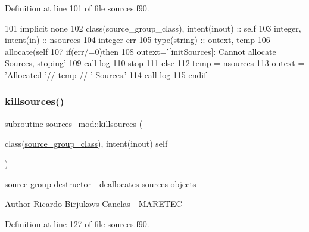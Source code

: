 Definition at line 101 of file sources.\+f90.


\begin{DoxyCode}
101     \textcolor{keywordtype}{implicit none}
102     \textcolor{keywordtype}{class}(source\_group\_class), \textcolor{keywordtype}{intent(inout)} :: self
103     \textcolor{keywordtype}{integer}, \textcolor{keywordtype}{intent(in)} :: nsources
104     \textcolor{keywordtype}{integer} err
105     \textcolor{keywordtype}{type}(string) :: outext, temp
106     \textcolor{keyword}{allocate}(self%
107     \textcolor{keywordflow}{if}(err/=0)\textcolor{keywordflow}{then}
108         outext=\textcolor{stringliteral}{'[initSources]: Cannot allocate Sources, stoping'}
109         \textcolor{keyword}{call }log%
110         stop
111     \textcolor{keywordflow}{else}
112         temp = nsources
113         outext = \textcolor{stringliteral}{'Allocated '}// temp // \textcolor{stringliteral}{' Sources.'}
114         \textcolor{keyword}{call }log%
115 \textcolor{keywordflow}{    endif}
\end{DoxyCode}
\mbox{\label{namespacesources__mod_aee745aa084adcfa41ecfc3469b90aa8e}} 
\subsubsection{\texorpdfstring{killsources()}{killsources()}}
{\footnotesize\ttfamily subroutine sources\+\_\+mod\+::killsources (\begin{DoxyParamCaption}\item[{class(\mbox{\hyperlink{structsources__mod_1_1source__group__class}{source\+\_\+group\+\_\+class}}), intent(inout)}]{self }\end{DoxyParamCaption})\hspace{0.3cm}{\ttfamily [private]}}



source group destructor -\/ deallocates sources objects 

\begin{DoxyAuthor}{Author}
Ricardo Birjukovs Canelas -\/ M\+A\+R\+E\+T\+EC 
\end{DoxyAuthor}


Definition at line 127 of file sources.\+f90.


